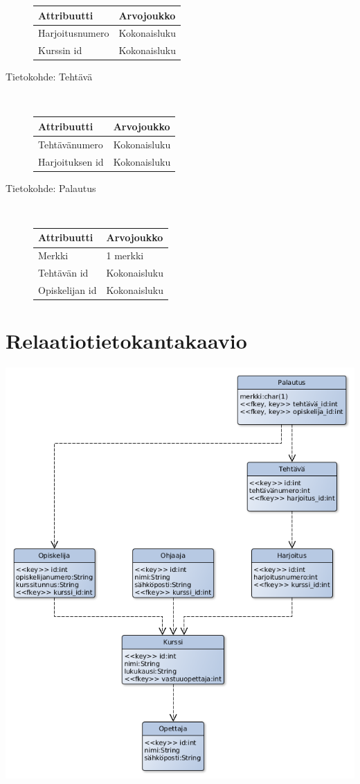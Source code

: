 \documentclass[a4paper,12pt, titlepage]{article}
\begin{document}
\begin{description}
	\begin{tabular}{| l | l |}
	\hline
	Attribuutti & Arvojoukko \\ \hline
	Harjoitusnumero & Kokonaisluku \\ \hline
	Kurssin id & Kokonaisluku \\ \hline
	\end{tabular}
	\item[Tietokohde: Tehtävä] \hfill \\
	\begin{tabular}{| l | l |}
	\hline
	Attribuutti & Arvojoukko \\ \hline
	Tehtävänumero & Kokonaisluku \\ \hline
	Harjoituksen id & Kokonaisluku \\ \hline
	\end{tabular}
	\item[Tietokohde: Palautus] \hfill \\
	\begin{tabular}{| l | l |}
	\hline
	Attribuutti & Arvojoukko \\ \hline
	Merkki & 1 merkki \\ \hline
	Tehtävän id & Kokonaisluku \\ \hline
	Opiskelijan id & Kokonaisluku \\ \hline
	\end{tabular}
\end{description}

\section{Relaatiotietokantakaavio}

\includegraphics[scale=0.5]{relaatiokaavio}
\end{document}
